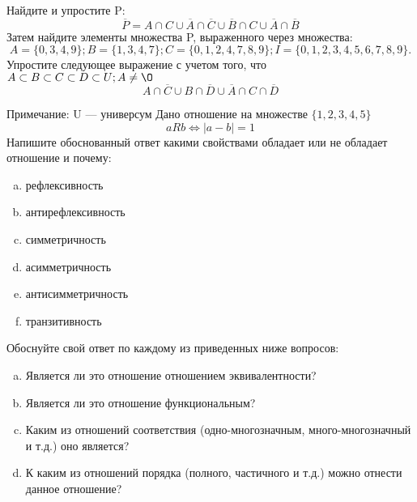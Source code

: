 \documentclass[10pt]{exam}
\begin{document}
\begin{questions}
\question
Найдите и упростите P:
\begin{equation*}
\overline{P} = A \cap C \cup \overline{A} \cap \overline{C} \cup \overline{B} \cap C \cup \overline{A} \cap \overline{B}
\end{equation*}
Затем найдите элементы множества P, выраженного через множества:
\begin{equation*}
A = \{0, 3, 4, 9\}; 
B = \{1, 3, 4, 7\};
C = \{0, 1, 2, 4, 7, 8, 9\};
I = \{0, 1, 2, 3, 4, 5, 6, 7, 8, 9\}.
\end{equation*}\question
Упростите следующее выражение с учетом того, что $A\subset B \subset C \subset D \subset U; A \neq \O$
\begin{equation*}
A \cap  \overline{C} \cup B \cap \overline{D} \cup  \overline{A} \cap C \cap  \overline{D}
\end{equation*}

Примечание: U — универсум\question
Дано отношение на множестве $\{1, 2, 3, 4, 5\}$ 
\begin{equation*}
aRb \iff |a-b| = 1
\end{equation*}
Напишите обоснованный ответ какими свойствами обладает или не обладает отношение и почему:   
\begin{enumerate} [a)]\setcounter{enumi}{0}
\item рефлексивность
\item антирефлексивность
\item симметричность
\item асимметричность
\item антисимметричность
\item транзитивность
\end{enumerate}

Обоснуйте свой ответ по каждому из приведенных ниже вопросов:
\begin{enumerate} [a)]\setcounter{enumi}{0}
    \item Является ли это отношение отношением эквивалентности?
    \item Является ли это отношение функциональным?
    \item Каким из отношений соответствия (одно-многозначным, много-многозначный и т.д.) оно является?
    \item К каким из отношений порядка (полного, частичного и т.д.) можно отнести данное отношение?
\end{enumerate}


\end{questions}
\end{document}

